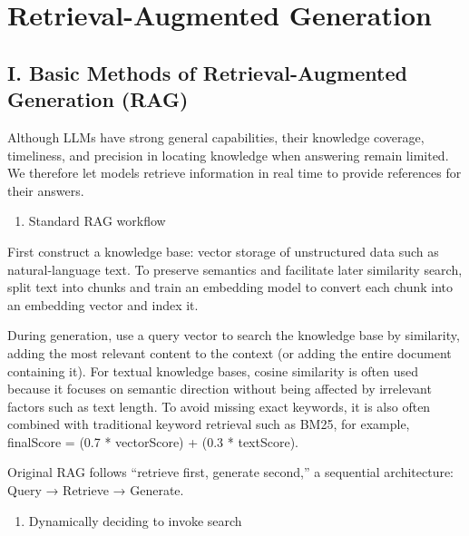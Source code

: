 \setcounter{section}{0}

\hypertarget{retrieval-augmented-generation}{%
\section{Retrieval-Augmented Generation}\label{retrieval-augmented-generation}}

\hypertarget{i.-basic-methods-of-retrieval-augmented-generation-rag}{%
\subsection{I. Basic Methods of Retrieval-Augmented Generation (RAG)}\label{i.-basic-methods-of-retrieval-augmented-generation-rag}}

Although LLMs have strong general capabilities, their knowledge coverage, timeliness, and precision in locating knowledge when answering remain limited. We therefore let models retrieve information in real time to provide references for their answers.

\begin{enumerate}
\def\labelenumi{(\Roman{enumi})}
\tightlist
\item
  Standard RAG workflow
\end{enumerate}

First construct a knowledge base: vector storage of unstructured data such as natural-language text. To preserve semantics and facilitate later similarity search, split text into chunks and train an embedding model to convert each chunk into an embedding vector and index it.

During generation, use a query vector to search the knowledge base by similarity, adding the most relevant content to the context (or adding the entire document containing it). For textual knowledge bases, cosine similarity is often used because it focuses on semantic direction without being affected by irrelevant factors such as text length. To avoid missing exact keywords, it is also often combined with traditional keyword retrieval such as BM25, for example, finalScore = (0.7 * vectorScore) + (0.3 * textScore).

Original RAG follows ``retrieve first, generate second,'' a sequential architecture: Query → Retrieve → Generate.

\begin{enumerate}
\def\labelenumi{(\Roman{enumi})}
\setcounter{enumi}{1}
\tightlist
\item
  Dynamically deciding to invoke search
\end{enumerate}

